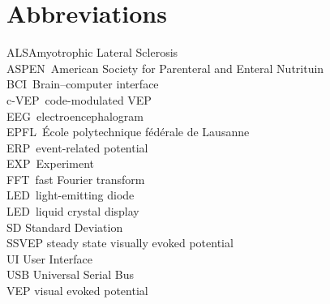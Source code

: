 \chapter{Abbreviations}
ALS\hfill Amyotrophic Lateral Sclerosis\\
ASPEN\	American Society for Parenteral and Enteral Nutrituin\\
BCI\	Brain–computer interface\\
c-VEP\	code-modulated VEP\\
EEG\	electroencephalogram\\
EPFL\	École polytechnique fédérale de Lausanne\\
ERP\	event-related potential\\
EXP\	Experiment\\
FFT\	fast Fourier transform\\
LED\	light-emitting diode\\
LED\	liquid crystal display\\
SD		Standard Deviation\\
SSVEP	steady state visually evoked potential\\
UI		User Interface\\
USB		Universal Serial Bus\\
VEP		visual evoked potential\\
